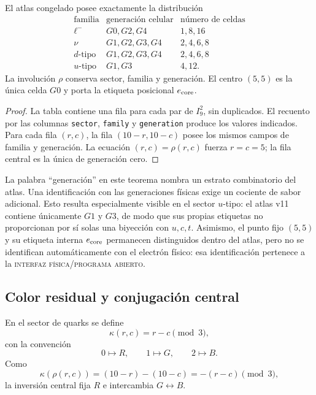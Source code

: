 \begin{theorem}
\label{thm:censo-atlas-81}
El atlas congelado posee exactamente la distribución
\[
\begin{array}{c|c|c}
\text{familia}&\text{generación celular}&\text{número de celdas}\\ \hline
\ell^-&G0,G2,G4&1,8,16\\
\nu&G1,G2,G3,G4&2,4,6,8\\
d\text{-tipo}&G1,G2,G3,G4&2,4,6,8\\
u\text{-tipo}&G1,G3&4,12.
\end{array}
\]
La involución \(\rho\) conserva sector, familia y generación. El centro
\((5,5)\) es la única celda \(G0\) y porta la etiqueta posicional
\(e_{\rm core}\).
\end{theorem}
\begin{proof}
La tabla contiene una fila para cada par de \(I_9^2\), sin duplicados. El
recuento por las columnas \texttt{sector}, \texttt{family} y
\texttt{generation} produce los valores indicados. Para cada fila
\((r,c)\), la fila \((10-r,10-c)\) posee los mismos campos de familia y
generación. La ecuación \((r,c)=\rho(r,c)\) fuerza \(r=c=5\); la fila central
es la única de generación cero.
\end{proof}

La palabra ``generación'' en este teorema nombra un estrato combinatorio del
atlas. Una identificación con las generaciones físicas exige un cociente de
sabor adicional. Esto resulta especialmente visible en el sector \(u\)-tipo:
el atlas v11 contiene únicamente \(G1\) y \(G3\), de modo que sus propias
etiquetas no proporcionan por sí solas una biyección con \(u,c,t\).
Asimismo, el punto fijo \((5,5)\) y su etiqueta interna \(e_{\rm core}\)
permanecen distinguidos dentro del atlas, pero no se identifican
automáticamente con el electrón físico: esa identificación pertenece a la
\textsc{interfaz física}/\textsc{programa abierto}.

\subsection{Color residual y conjugación central}

En el sector de quarks se define
\[
 \kappa(r,c)=r-c\pmod3,
\]
con la convención
\[
 0\longmapsto R,
 \qquad 1\longmapsto G,
 \qquad 2\longmapsto B.
\]
Como
\[
 \kappa(\rho(r,c))=(10-r)-(10-c)=-(r-c)\pmod3,
\]
la inversión central fija \(R\) e intercambia \(G\leftrightarrow B\).

